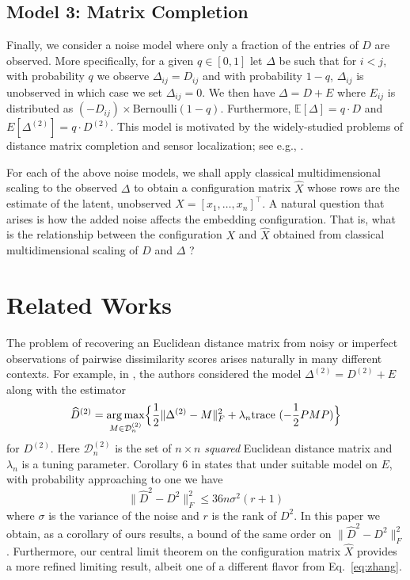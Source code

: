 \subsection{Model 3: Matrix Completion}
\label{matrix_completion} 
Finally, we consider a noise model where only a fraction of the
entries of $D$ are observed. More specifically, for a given $q \in [0,1]$ let
$\Delta$ be such that for $i < j$, with probability $q$ we observe $\Delta_{ij} = D_{ij}$ and with probability $1 - q$, $\Delta_{ij}$ is
unobserved in which case we set $\Delta_{ij} = 0$. We then have
$\Delta = D + E$ where $E_{ij}$ is distributed as $(- D_{ij}) \times \mathrm{Bernoulli}(1-q)$. Furthermore, $\mathbb{E}[\Delta] = q \cdot
D$ and $E[\Delta^{(2)}] = q \cdot D^{(2)}$. This model is motivated
by the widely-studied problems of distance matrix completion and sensor
localization; see e.g.,
\citet{Javanmard2013,Chatterjee,Alfakih1999, wirelesssensor}. 

For each of the above noise models, we shall apply classical
multidimensional scaling to the observed $\Delta$ to obtain a
configuration matrix $\hat{X}$ whose rows are the estimate of the latent,
unobserved $X =  [x_1, \dots, x_n]^{\top}$. A natural question that arises is how the added
noise affects the embedding configuration. That is, what is the
relationship between the configuration $X$ and $\hat{X}$ obtained from classical
multidimensional scaling of $D$ and $\Delta$ ?


\section{Related Works}
\label{RW} The problem of recovering an Euclidean distance matrix from
noisy or imperfect observations of pairwise dissimilarity scores
arises naturally in many different contexts. For example, in
\cite{DsquaredplusE}, the authors considered the model $\Delta^{(2)} = D^{(2)} +
E$ along with the estimator
$$\widehat{D}^{(2)} = \operatorname*{arg\,max}_{M \in \mathcal{D}^{(2)}_n} \Bigl\{ \frac{1}{2} \|\Delta^{(2)} - M\|_{F}^2 + \lambda_n \mathrm{trace} \,\,(-\frac{1}{2}PMP) \Bigr \}$$ 
for $D^{(2)}$. Here $\mathcal{D}^{(2)}_n$ is the set of $n \times n$
{\em squared} Euclidean distance matrix and $\lambda_n$ is a tuning
parameter. Corollary 6 in \cite{DsquaredplusE} states that under suitable model on $E$, with probability approaching to one we have 
\begin{equation}
\label{eq:zhang}
\|\hat{D}^2 - D^2 \|_F^2 \leq 36n\sigma^2(r+1)
\end{equation}
where $\sigma$ is the variance of the noise and $r$ is the rank of
$D^{2}$.  In this paper we obtain, as a corollary of ours results, a
bound of the same order on $\|\hat{D}^2 - D^2\|_{F}^2$. Furthermore,
our central limit theorem on the configuration matrix $\hat{X}$
provides a more refined limiting result, albeit one of a different
flavor from Eq.~\eqref{eq:zhang}.

